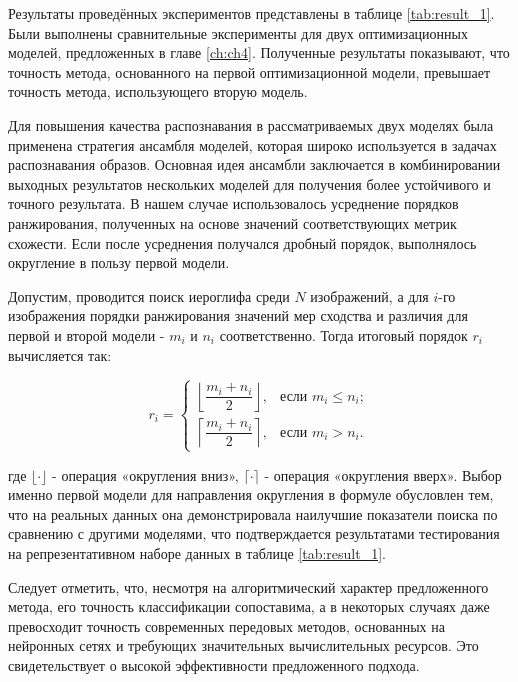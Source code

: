 Результаты проведённых экспериментов представлены в таблице \cref{tab:result_1}. Были выполнены сравнительные эксперименты для двух оптимизационных моделей, предложенных в главе \cref{ch:ch4}. Полученные результаты показывают, что точность метода, основанного на первой оптимизационной модели, превышает точность метода, использующего вторую модель.

Для повышения качества распознавания в рассматриваемых двух моделях была применена стратегия ансамбля моделей, которая широко используется в задачах распознавания образов. Основная идея ансамбли заключается в комбинировании выходных результатов нескольких моделей для получения более устойчивого и точного результата. В нашем случае использовалось усреднение порядков ранжирования, полученных на основе значений соответствующих метрик схожести. Если после усреднения получался дробный порядок, выполнялось округление в пользу первой модели.

Допустим, проводится поиск иероглифа среди $N$ изображений, а для $i$-го изображения порядки ранжирования значений мер сходства и различия для первой и второй модели - $m_i$ и $n_i$ соответственно. Тогда итоговый порядок $r_i$ вычисляется так:

\[
    r_i =
    \begin{cases}
        \left\lfloor \dfrac{m_i+n_i}{2} \right\rfloor, & \text{если } m_i \leq n_i; \\[0.5em]
        \left\lceil \dfrac{m_i+n_i}{2} \right\rceil,   & \text{если } m_i > n_i.
    \end{cases}
\]

где $\lfloor \cdot \rfloor$ - операция «округления вниз», $\lceil \cdot \rceil$ - операция «округления вверх». Выбор именно первой модели для направления округления в формуле обусловлен тем, что на реальных данных она демонстрировала наилучшие показатели поиска по сравнению с другими моделями, что подтверждается результатами тестирования на репрезентативном наборе данных в таблице \cref{tab:result_1}.

Следует отметить, что, несмотря на алгоритмический характер предложенного метода, его точность классификации сопоставима, а в некоторых случаях даже превосходит точность современных передовых методов, основанных на нейронных сетях и требующих значительных вычислительных ресурсов. Это свидетельствует о высокой эффективности предложенного подхода.

